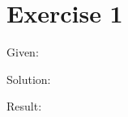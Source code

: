 \documentclass[a4paper, 10pt]{scrartcl}
\begin{document}
\section{Exercise 1}

Given:

Solution:

Result:
\end{document}
